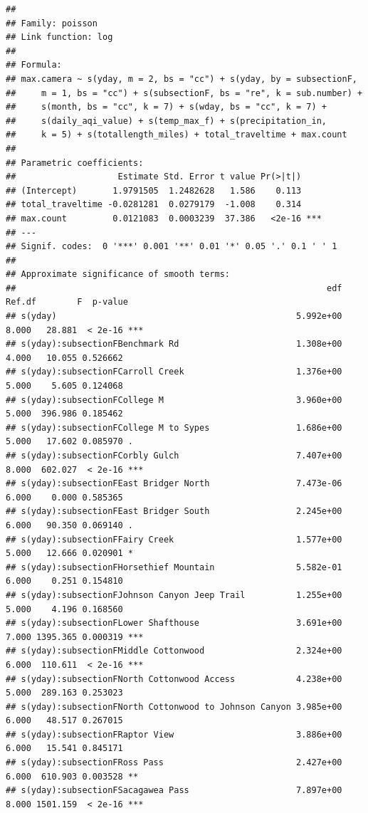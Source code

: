 \documentclass[
]{book}
\begin{document}
\begin{verbatim}
## 
## Family: poisson 
## Link function: log 
## 
## Formula:
## max.camera ~ s(yday, m = 2, bs = "cc") + s(yday, by = subsectionF, 
##     m = 1, bs = "cc") + s(subsectionF, bs = "re", k = sub.number) + 
##     s(month, bs = "cc", k = 7) + s(wday, bs = "cc", k = 7) + 
##     s(daily_aqi_value) + s(temp_max_f) + s(precipitation_in, 
##     k = 5) + s(totallength_miles) + total_traveltime + max.count
## 
## Parametric coefficients:
##                    Estimate Std. Error t value Pr(>|t|)    
## (Intercept)       1.9791505  1.2482628   1.586    0.113    
## total_traveltime -0.0281281  0.0279179  -1.008    0.314    
## max.count         0.0121083  0.0003239  37.386   <2e-16 ***
## ---
## Signif. codes:  0 '***' 0.001 '**' 0.01 '*' 0.05 '.' 0.1 ' ' 1
## 
## Approximate significance of smooth terms:
##                                                             edf Ref.df        F  p-value    
## s(yday)                                               5.992e+00  8.000   28.881  < 2e-16 ***
## s(yday):subsectionFBenchmark Rd                       1.308e+00  4.000   10.055 0.526662    
## s(yday):subsectionFCarroll Creek                      1.376e+00  5.000    5.605 0.124068    
## s(yday):subsectionFCollege M                          3.960e+00  5.000  396.986 0.185462    
## s(yday):subsectionFCollege M to Sypes                 1.686e+00  5.000   17.602 0.085970 .  
## s(yday):subsectionFCorbly Gulch                       7.407e+00  8.000  602.027  < 2e-16 ***
## s(yday):subsectionFEast Bridger North                 7.473e-06  6.000    0.000 0.585365    
## s(yday):subsectionFEast Bridger South                 2.245e+00  6.000   90.350 0.069140 .  
## s(yday):subsectionFFairy Creek                        1.577e+00  5.000   12.666 0.020901 *  
## s(yday):subsectionFHorsethief Mountain                5.582e-01  6.000    0.251 0.154810    
## s(yday):subsectionFJohnson Canyon Jeep Trail          1.255e+00  5.000    4.196 0.168560    
## s(yday):subsectionFLower Shafthouse                   3.691e+00  7.000 1395.365 0.000319 ***
## s(yday):subsectionFMiddle Cottonwood                  2.324e+00  6.000  110.611  < 2e-16 ***
## s(yday):subsectionFNorth Cottonwood Access            4.238e+00  5.000  289.163 0.253023    
## s(yday):subsectionFNorth Cottonwood to Johnson Canyon 3.985e+00  6.000   48.517 0.267015    
## s(yday):subsectionFRaptor View                        3.886e+00  6.000   15.541 0.845171    
## s(yday):subsectionFRoss Pass                          2.427e+00  6.000  610.903 0.003528 ** 
## s(yday):subsectionFSacagawea Pass                     7.897e+00  8.000 1501.159  < 2e-16 ***

\end{verbatim}
\end{document}
